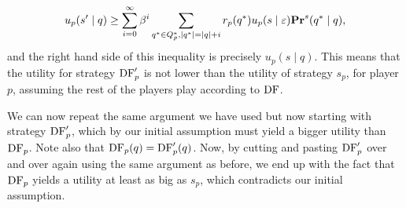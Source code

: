 $$u_p(s' \mid q) \geq \sum_{i=0}^\infty \beta^i \sum_{q^* \in Q^*_p, |q^*| = |q| + i} r_p(q^*) u_p(s \mid \varepsilon)  \mathbf{Pr}^s(q^* \mid q), $$
and the right hand side of this inequality is precisely $u_p(s \mid q)$. This means that the utility for strategy $\text{\rm DF}'_p$ is not lower than the utility of strategy $s_p$, for player $p$, assuming the rest of the players play according to $\text{\rm DF}$. 

We can now repeat the same argument we have used but now starting with strategy $\text{\rm DF}'_p$, which by our initial assumption must yield 
a bigger utility than $\text{\rm DF}_p$. Note also that $\text{\rm DF}_p(q) = \text{\rm DF}_p'(q)$. 
Now, by cutting and pasting $\text{\rm DF}'_p$ over and over again using the same argument as before, we end up with the fact that $\text{\rm DF}_p$ yields 
a utility at least as big as $s_p$, which contradicts our initial assumption. 








